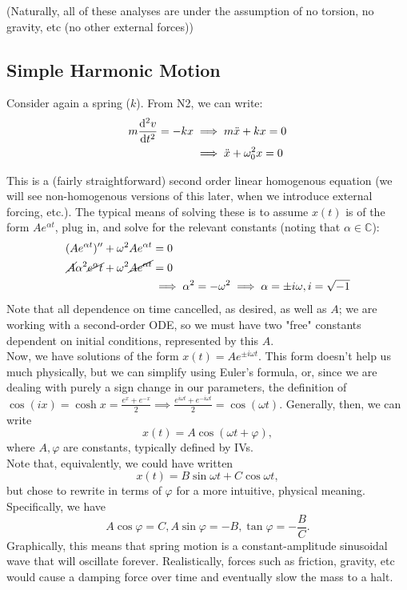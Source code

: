 \documentclass[12pt]{article}
\begin{document}
(Naturally, all of these analyses are under the assumption of no torsion, no gravity, etc (no other external forces))

\subsection{Simple Harmonic Motion}

Consider again a spring ($k$). From N2, we can write:
\begin{align*}
  m \dv[2]{v}{t} = -kx &\implies m \ddot{x} + kx = 0\\
  &\implies \ddot{x} + \omega_0^2 x = 0
\end{align*}

This is a (fairly straightforward) second order linear homogenous equation (we will see non-homogenous versions of this later, when we introduce external forcing, etc.). The typical means of solving these is to assume $x(t)$ is of the form $A e^{\alpha t}$, plug in, and solve for the relevant constants (noting that $\alpha \in \mathbb{C}$):
\begin{align*}
  (A e^{\alpha t})'' + \omega^2 Ae^{\alpha t} &= 0\\
  \cancel{A} \alpha^2 \cancel{e^\alpha t} + \omega^2 \cancel{Ae^{\alpha t}} &=0\\
  &\implies \alpha^2 = -\omega^2\implies \alpha = \pm i \omega, i = \sqrt{-1}
\end{align*}
Note that all dependence on time cancelled, as desired, as well as $A$; we are working with a second-order ODE, so we must have two "free" constants dependent on initial conditions, represented by this $A$.\\
Now, we have solutions of the form $x(t) = Ae^{\pm i \omega t}$. This form doesn't help us much physically, but we can simplify using Euler's formula, or, since we are dealing with purely a sign change in our parameters, the definition of $\cos (ix) = \cosh x  = \frac{e^{x}+e^{-x}}{2} \implies \frac{e^{i \omega t} + e^{-i \omega t}}{2} =\cos (\omega t)$. Generally, then, we can write \[x(t) = A \cos (\omega t + \varphi),\] where $A, \varphi$ are constants, typically defined by IVs.\\Note that, equivalently, we could have written \[x(t) = B \sin \omega t + C \cos \omega t,\] but chose to rewrite in terms of $\varphi$ for a more intuitive, physical meaning. Specifically, we have \[A \cos \varphi = C, A \sin \varphi = -B, \tan \varphi = - \frac{B}{C}.\] Graphically, this means that spring motion is a constant-amplitude sinusoidal wave that will oscillate forever. Realistically, forces such as friction, gravity, etc would cause a damping force over time and eventually slow the mass to a halt.
\end{document}
